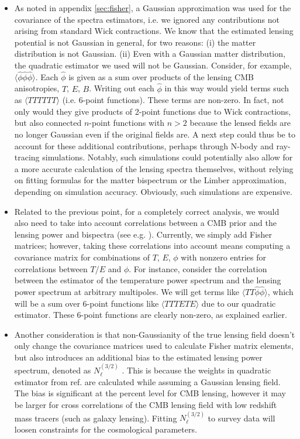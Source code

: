 \documentclass[11pt]{article} %
\begin{document}
\begin{itemize}
     \item As noted in appendix \ref{sec:fisher}, a Gaussian approximation was used for the covariance of the spectra estimators, i.e. we ignored any contributions not arising from standard Wick contractions. We know that the estimated lensing potential is not Gaussian in general, for two reasons: (i) the matter distribution is not Gaussian. (ii) Even with a Gaussian matter distribution, the quadratic estimator we used will not be Gaussian. Consider, for example, $\langle \hat \phi \hat \phi \hat \phi \rangle$. Each $\hat \phi$ is given as a sum over products of the lensing CMB anisotropies, $T$, $E$, $B$. Writing out each $\hat \phi$ in this way would yield terms such as $\langle TTTTTT\rangle$ (i.e. 6-point functions). These terms are non-zero. In fact, not only would they give products of 2-point functions due to Wick contractions, but also connected $n$-point functions with $n>2$ because the lensed fields are no longer Gaussian even if the original fields are. A next step could thus be to account for these additional contributions, perhaps through N-body and ray-tracing simulations. Notably, such simulations could potentially also allow for a more accurate calculation of the lensing spectra themselves, without relying on fitting formulas for the matter bispectrum or the Limber approximation, depending on simulation accuracy. Obviously, such simulations are expensive. 

     \item Related to the previous point, for a completely correct analysis, we would also need to take into account correlations between a CMB prior and the lensing power and bispectra (see e.g. \cite{schmittfull2018}). Currently, we simply add Fisher matrices; however, taking these correlations into account means computing a covariance matrix for combinations of $T$, $E$, $\phi$ with nonzero entries for correlations between $T$/$E$ and $\phi$. For instance, consider the correlation between the estimator of the temperature power spectrum and the lensing power spectrum at arbitrary multipoles. We will get terms like $\langle TT\hat\phi\hat\phi \rangle$, which will be a sum over 6-point functions like $\langle TT TETE\rangle$ due to our quadratic estimator. These 6-point functions are clearly non-zero, as explained earlier.

     \item Another consideration is that non-Gaussianity of the true lensing field doesn't only change the covariance matrices used to calculate Fisher matrix elements, but also introduces an additional bias to the estimated lensing power spectrum, denoted as $N^{(3/2)}_\ell$ \cite{B_hm_2016, B_hm_2018}. This is because the weights in quadratic estimator from ref. \cite{Hu_2002} are calculated while assuming a Gaussian lensing field. The bias is significant at the percent level for CMB lensing, however it may be larger for cross correlations of the CMB lensing field with low redshift mass tracers (such as galaxy lensing). Fitting $N^{(3/2)}_\ell$ to survey data will loosen constraints for the cosmological parameters.


\end{itemize}
\end{document}
